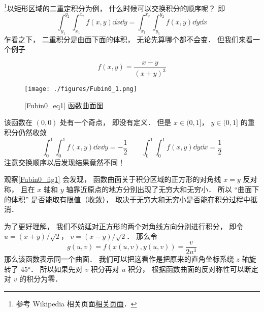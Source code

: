 

\footnote{参考 Wikipedia 相关页面\href{https://en.wikipedia.org/wiki/Fubini's_theorem}{相关页面}．}以矩形区域的二重定积分为例， 什么时候可以交换积分的顺序呢？ 即
\begin{equation}
\int_{y_1}^{y_2}\int_{x_1}^{x_2} f(x, y) \dd{x} \dd{y} = \int_{x_1}^{x_2}\int_{y_1}^{y_2} f(x, y) \dd{y}\dd{x}
\end{equation}
乍看之下， 二重积分是曲面下面的体积， 无论先算哪个都不会变． 但我们来看一个例子

\begin{example}{}
\begin{equation}\label{Fubin0_eq1}
f(x, y) = \frac{x - y}{(x+y)^3}
\end{equation}
\begin{figure}[ht]
\centering
\texttt{[image: ./figures/Fubin0\_1.png]}
\caption{\autoref{Fubin0_eq1} 函数曲面图} \label{Fubin0_fig1}
\end{figure}
该函数在 $(0,0)$ 处有一个奇点， 即没有定义． 但是 $x \in (0, 1]$， $y \in (0, 1]$ 的重积分仍然收敛
\begin{equation}
\int_0^1 \int_0^1 f(x,y) \dd{x} \dd{y} = -\frac{1}{2}
\qquad
\int_0^1 \int_0^1 f(x,y) \dd{y} \dd{x} = \frac{1}{2}
\end{equation}
注意交换顺序以后发现结果竟然不同！

观察\autoref{Fubin0_fig1} 会发现， 函数曲面关于积分区域的正方形的对角线 $x=y$ 反对称， 且在 $x$ 轴和 $y$ 轴靠近原点的地方分别出现了无穷大和无穷小． 所以 “曲面下的体积” 是否能取有限值（收敛）， 取决于无穷大和无穷小是否能在积分过程中抵消．

为了更好理解， 我们不妨延对正方形的两个对角线方向分别进行积分， 即令 $u = (x+y)/\sqrt{2}$， $v=(x-y)/\sqrt{2}$． 那么令
\begin{equation}
g(u,v) = f(x(u,v), y(u,v)) = \frac{v}{2u^3}
\end{equation}
那么该函数表示同一个曲面． 我们可以把这看作是把原来的直角坐标系绕 $z$ 轴旋转了 45°． 所以如果先对 $v$ 积分再对 $u$ 积分， 根据函数曲面的反对称性可以断定对 $v$ 的积分为零．

\end{example}
